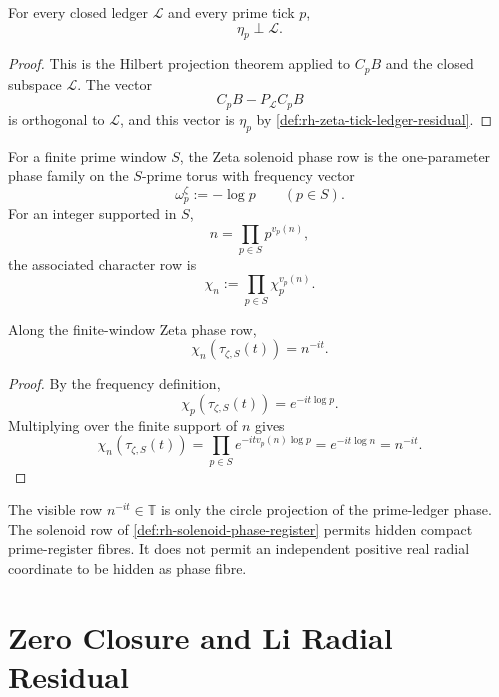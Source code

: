 \begin{theorem}
\label{thm:rh-zeta-prime-tick-orthogonal-ledger}
For every closed ledger $\mathcal L$ and every prime tick $p$,
$$
\eta_p\perp\mathcal L.
$$
\end{theorem}

\begin{proof}
This is the Hilbert projection theorem applied to $C_pB$ and the closed
subspace $\mathcal L$. The vector
$$
C_pB-P_{\mathcal L}C_pB
$$
is orthogonal to $\mathcal L$, and this vector is $\eta_p$ by
\autoref{def:rh-zeta-tick-ledger-residual}.
\end{proof}

\begin{definition}
\label{def:rh-zeta-finite-window-solenoid-phase-row}
For a finite prime window $S$, the Zeta solenoid phase row is the
one-parameter phase family on the $S$-prime torus with frequency vector
$$
\omega_p^{\zeta}:=-\log p
\qquad
(p\in S).
$$
For an integer supported in $S$,
$$
n=\prod_{p\in S}p^{v_p(n)},
$$
the associated character row is
$$
\chi_n:=\prod_{p\in S}\chi_p^{v_p(n)}.
$$
\end{definition}

\begin{theorem}
\label{thm:rh-zeta-solenoid-phase-reads-zeta-phase}
Along the finite-window Zeta phase row,
$$
\chi_n(\tau_{\zeta,S}(t))=n^{-it}.
$$
\end{theorem}

\begin{proof}
By the frequency definition,
$$
\chi_p(\tau_{\zeta,S}(t))=e^{-it\log p}.
$$
Multiplying over the finite support of $n$ gives
$$
\chi_n(\tau_{\zeta,S}(t))
=
\prod_{p\in S}e^{-itv_p(n)\log p}
=
e^{-it\log n}
=
n^{-it}.
$$
\end{proof}

\begin{principle}
\label{prin:rh-zeta-phase-not-bare-circle-readout}
The visible row $n^{-it}\in\mathbb T$ is only the circle projection of the
prime-ledger phase. The solenoid row of
\autoref{def:rh-solenoid-phase-register} permits hidden compact
prime-register fibres. It does not permit an independent positive real
radial coordinate to be hidden as phase fibre.
\end{principle}

\section{Zero Closure and Li Radial Residual}
\label{sec:rh-zeta-zero-li-radial-residual}

